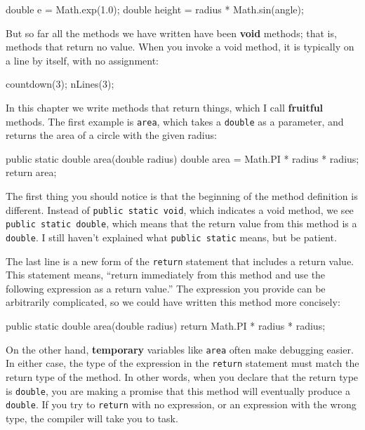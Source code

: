 \documentclass{book}
\begin{document}
\begin{verbatimtab}
    double e = Math.exp(1.0);
    double height = radius * Math.sin(angle);
\end{verbatimtab}
%
But so far all the methods we have written have been {\bf void}
methods; that is, methods that return no value.  When you invoke
a void method, it is typically on a line by itself, with
no assignment:

\begin{verbatimtab}
    countdown(3);
    nLines(3);
\end{verbatimtab}
%
In this chapter we write methods that return things, which I call 
{\bf fruitful} methods.  The first example is {\tt area}, which takes a
{\tt double} as a parameter, and returns the area of a circle with the
given radius:

\begin{verbatimtab}
  public static double area(double radius) {
    double area = Math.PI * radius * radius;
    return area;
  }
\end{verbatimtab}
%
The first thing you should notice is that the beginning of the
method definition is different.  Instead of {\tt public static
void}, which indicates a void method, we see {\tt public static
double}, which means that the return value from this method
is a {\tt double}.  I still haven't explained what
{\tt public static} means, but be patient.


The last line is a new form of the
{\tt return} statement that includes a return value.  This
statement means, ``return immediately from this method and
use the following expression as a return value.''  The
expression you provide can be arbitrarily complicated,
so we could have written this method more concisely:

\begin{verbatimtab}
  public static double area(double radius) {
    return Math.PI * radius * radius;
  }
\end{verbatimtab}
%
On the other hand, {\bf temporary} variables like {\tt area} often
make debugging easier.  In either case, the type of the expression in
the {\tt return} statement must match the return type of the method.
In other words, when you declare that the return type is {\tt double},
you are making a promise that this method will eventually
produce a {\tt double}.  If you try to {\tt return} with no
expression, or an expression with the wrong type, the compiler will
take you to task.
\end{document}
